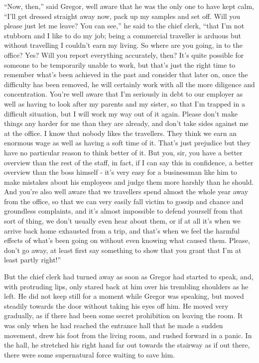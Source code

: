 \documentclass[12pt]{report}
\begin{document}
``Now, then,'' said Gregor, well aware that he was the only one to have
kept calm, ``I'll get dressed straight away now, pack up my samples and
set off. Will you please just let me leave? You can see,'' he said to
the chief clerk, ``that I'm not stubborn and I like to do my job; being
a commercial traveller is arduous but without travelling I couldn't earn
my living. So where are you going, in to the office? Yes? Will you
report everything accurately, then? It's quite possible for someone to
be temporarily unable to work, but that's just the right time to
remember what's been achieved in the past and consider that later on,
once the difficulty has been removed, he will certainly work with all
the more diligence and concentration. You're well aware that I'm
seriously in debt to our employer as well as having to look after my
parents and my sister, so that I'm trapped in a difficult situation, but
I will work my way out of it again. Please don't make things any harder
for me than they are already, and don't take sides against me at the
office. I know that nobody likes the travellers. They think we earn an
enormous wage as well as having a soft time of it. That's just prejudice
but they have no particular reason to think better of it. But you, sir,
you have a better overview than the rest of the staff, in fact, if I can
say this in confidence, a better overview than the boss himself - it's
very easy for a businessman like him to make mistakes about his
employees and judge them more harshly than he should. And you're also
well aware that we travellers spend almost the whole year away from the
office, so that we can very easily fall victim to gossip and chance and
groundless complaints, and it's almost impossible to defend yourself
from that sort of thing, we don't usually even hear about them, or if at
all it's when we arrive back home exhausted from a trip, and that's when
we feel the harmful effects of what's been going on without even knowing
what caused them. Please, don't go away, at least first say something to
show that you grant that I'm at least partly right!''

But the chief clerk had turned away as soon as Gregor had started to
speak, and, with protruding lips, only stared back at him over his
trembling shoulders as he left. He did not keep still for a moment while
Gregor was speaking, but moved steadily towards the door without taking
his eyes off him. He moved very gradually, as if there had been some
secret prohibition on leaving the room. It was only when he had reached
the entrance hall that he made a sudden movement, drew his foot from the
living room, and rushed forward in a panic. In the hall, he stretched
his right hand far out towards the stairway as if out there, there were
some supernatural force waiting to save him.
\end{document}
